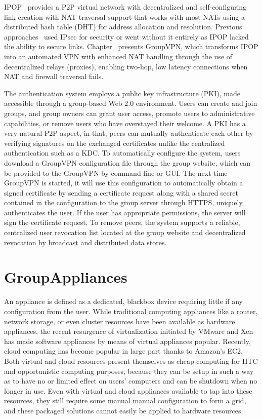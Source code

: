 IPOP~\cite{ipop} provides a P2P virtual network with decentralized and
self-configuring link creation with NAT traversal support that works with
most NATs using a distributed hash table (DHT) for address
allocation and resolution.  Previous approaches~\cite{grid_appliance} used
IPsec for security or went without it entirely as IPOP lacked the ability to
secure links.  Chapter~\cite{vpns} presents GroupVPN, which transforms IPOP
into an automated VPN with enhanced NAT handling through the use of
decentralized relays (proxies), enabling two-hop, low latency connections when
NAT and firewall traversal fails.

The authentication system employs a public key infrastructure (PKI), made
accessible through a group-based Web 2.0 environment.  Users can create and
join groups, and group owners can grant user access, promote users to
administrative capabilities, or remove users who have overstayed their
welcome.  A PKI has a very natural P2P aspect, in that, peers can mutually
authenticate each other by verifying signatures on the exchanged certificates
unlike the centralized authentication such as a KDC.  To automatically configure
the system, users download a GroupVPN configuration file through the group
website, which can be provided to the GroupVPN by command-line or GUI.  The
next time GroupVPN is started, it will use this configuration to automatically
obtain a signed certificate by sending a certificate request along with a
shared secret contained in the configuration to the group server through HTTPS,
uniquely authenticates the user.  If the user has appropriate permissions, the
server will sign the certificate request.  To remove peers, the system supports
a reliable, centralized user revocation list located at the group website and
decentralized revocation by broadcast and distributed data stores.

\section{GroupAppliances}
An appliance is defined as a dedicated, blackbox device requiring little if any
configuration from the user.  While traditional computing appliances like a
router, network storage, or even cluster resources have been available as
hardware appliances, the recent resurgence of virtualization initiated by
VMware and Xen has made software appliances by means of virtual appliances
popular.  Recently, cloud computing has become popular in large part thanks to
Amazon's EC2.  Both virtual and cloud resources present themselves as cheap
computing for HTC and opportunistic computing purposes, because they can be
setup in such a way as to have no or limited effect on users' computers and can
be shutdown when no longer in use.  Even with virtual and cloud appliances 
available to tap into these resources, they still require some manual
manual configuration to form a grid, and these packaged solutions cannot easily
be applied to hardware resources.

